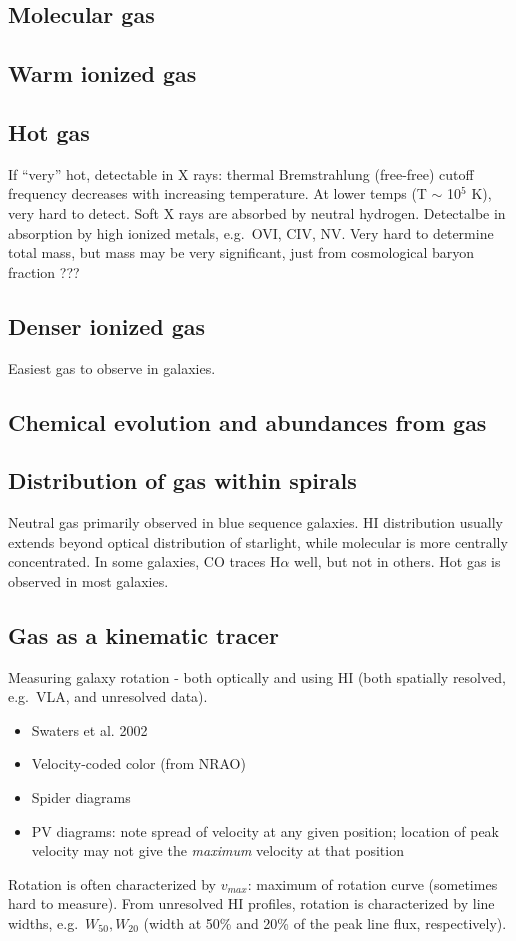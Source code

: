 \documentclass{article}
\newcommand{\mynotes}[1]{\textcolor{cadmiumorange}{#1}}
\begin{document}
\subsection{Molecular gas}
\subsection{Warm ionized gas}
\subsection{Hot gas}
If ``very'' hot, detectable in X rays: thermal Bremstrahlung (free-free)
cutoff frequency decreases with increasing temperature. At lower temps
(T $\sim$ 10$^{5}$ K), very hard to detect. Soft X rays are absorbed
by neutral hydrogen. Detectalbe in absorption by high ionized metals,
e.g.\ OVI, CIV, NV. Very hard to determine total mass, but mass may be
very significant, just from cosmological baryon fraction \mynotes{???}
\subsection{Denser ionized gas}
Easiest gas to observe in galaxies.
\subsection{Chemical evolution and abundances from gas}
\subsection{Distribution of gas within spirals}
Neutral gas primarily observed in blue sequence galaxies.
HI distribution usually extends beyond optical distribution of starlight,
while molecular is more centrally concentrated. In some galaxies,
CO traces H$\alpha$ well, but not in others. Hot gas is observed in
most galaxies.

\subsection{Gas as a kinematic tracer}
Measuring galaxy rotation - both optically and using HI (both spatially
resolved, e.g.\ VLA, and unresolved data).
\begin{itemize}
    \item Swaters et al. 2002
    \item Velocity-coded color (from NRAO)
    \item Spider diagrams
    \item PV diagrams: note spread of velocity at any given position;
        location of peak velocity may not give the \emph{maximum}
        velocity at that position
\end{itemize}
Rotation is often characterized by $v_{max}$: maximum of rotation curve
(sometimes hard to measure).  From unresolved HI profiles, rotation is
characterized by line widths, e.g.\ $W_{50}, W_{20}$ (width at 50\% and 20\% of
the peak line flux, respectively).
\end{document}
